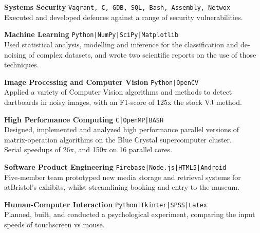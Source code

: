 \documentclass[10pt]{article}
\newcommand{\bold}[1]{\textbf{\textcolor{dark}{#1}}}
\newcommand{\zz}[3]{{\large\bold{#1}} \hfill {\small \colorbox{light}{\texttt{#3}}}\\{#2}\vspace{0.5em}}
\newcommand{\li}{\textcolor{mid}{|}}
\begin{document}
\begin{minipage}[t]{0.66\textwidth}


\zz{Systems Security}
{Executed and developed defences against a range of security vulnerabilities.}
{Vagrant, C, GDB, SQL, Bash, Assembly, Netwox}

\zz{Machine Learning}
{Used statistical analysis, modelling and inference for the classification and de-noising of complex datasets, and wrote two scientific reports on the use of those techniques.}
{Python\li NumPy\li SciPy\li Matplotlib}

\zz{Image Processing and Computer Vision}
{Applied a variety of Computer Vision algorithms and methods to detect dartboards in noisy images, with an F1-score of 125x the stock VJ method.}
{Python\li OpenCV}

\zz{High Performance Computing}
{Designed, implemented and analyzed high performance parallel versions of matrix-operation algorithms on the Blue Crystal supercomputer cluster.\\
Serial speedups of 26x, and 150x on 16 parallel cores.}
{C\li OpenMP\li BASH}




\zz{Software Product Engineering}
{Five-member team prototyped new media storage and retrieval systems for atBristol's exhibits, whilst streamlining booking and entry to the museum.}{Firebase\li Node.js\li HTML5\li Android}

\zz{Human-Computer Interaction}
{Planned, built, and conducted a psychological experiment, comparing the input speeds of touchscreen vs mouse.}{Python\li Tkinter\li SPSS\li Latex}



\end{minipage}
\end{document}
